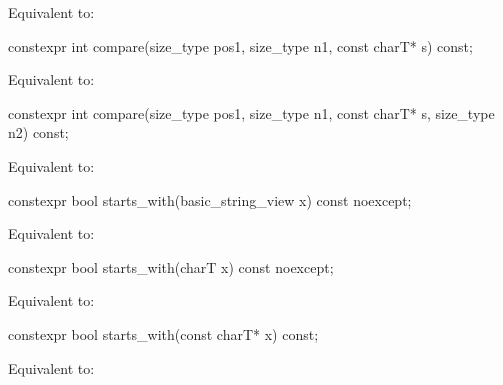 \begin{itemdescr}
\pnum
\effects
Equivalent to: 
\end{itemdescr}

%
\begin{itemdecl}
constexpr int compare(size_type pos1, size_type n1, const charT* s) const;
\end{itemdecl}

\begin{itemdescr}
\pnum
\effects
Equivalent to: 
\end{itemdescr}

%
\begin{itemdecl}
constexpr int compare(size_type pos1, size_type n1, const charT* s, size_type n2) const;
\end{itemdecl}

\begin{itemdescr}
\pnum
\effects
Equivalent to: 
\end{itemdescr}

%
\begin{itemdecl}
constexpr bool starts_with(basic_string_view x) const noexcept;
\end{itemdecl}

\begin{itemdescr}
\pnum
\effects
Equivalent to: 
\end{itemdescr}

%
\begin{itemdecl}
constexpr bool starts_with(charT x) const noexcept;
\end{itemdecl}

\begin{itemdescr}
\pnum
\effects
Equivalent to: 
\end{itemdescr}

%
\begin{itemdecl}
constexpr bool starts_with(const charT* x) const;
\end{itemdecl}

\begin{itemdescr}
\pnum
\effects
Equivalent to: 
\end{itemdescr}

